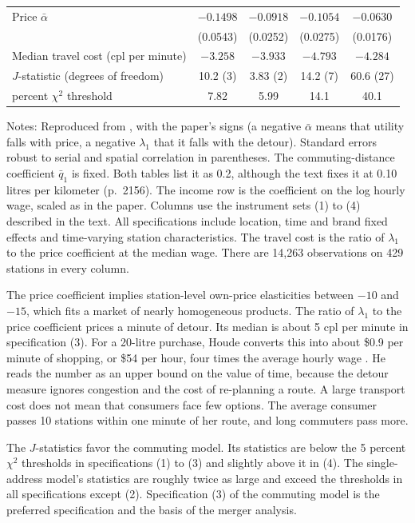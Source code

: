\begin{table}[htbp]
\begin{threeparttable}
\begin{tabular}{@{}lcccc@{}}
Price $\bar\alpha$ & $-0.1498$ & $-0.0918$ & $-0.1054$ & $-0.0630$ \\
 & (0.0543) & (0.0252) & (0.0275) & (0.0176) \\
Median travel cost (cpl per minute) & $-3.258$ & $-3.933$ & $-4.793$ & $-4.284$ \\
$J$-statistic (degrees of freedom) & 10.2 (3) & 3.83 (2) & 14.2 (7) & 60.6 (27) \\
\addlinespace
5 percent $\chi^2$ threshold & 7.82 & 5.99 & 14.1 & 40.1 \\
\bottomrule
\end{tabular}
\begin{tablenotes}[flushleft]
\footnotesize
\item Notes: Reproduced from \citet[Tables 3 and 4]{Houde2012}, with the paper's signs (a negative $\bar\alpha$ means
that utility falls with price, a negative $\lambda_1$ that it falls with the detour). Standard errors robust to serial
and spatial correlation in parentheses. The commuting-distance coefficient $\bar q_1$ is fixed. Both tables list it as
0.2, although the text fixes it at 0.10 litres per kilometer (p.~2156). The income row is the coefficient on the log hourly wage, scaled as in the paper. Columns use the instrument sets (1) to (4)
described in the text. All specifications include location, time and brand fixed effects and time-varying station
characteristics. The travel cost is the ratio of $\lambda_1$ to the price coefficient at the median wage. There are
14,263 observations on 429 stations in every column.
\end{tablenotes}
\end{threeparttable}
\end{table}

The price coefficient implies station-level own-price elasticities between $-10$ and $-15$, which fits a market of
nearly homogeneous products. The ratio of $\lambda_1$ to the price coefficient prices a minute of detour. Its median
is about 5 cpl per minute in specification (3). For a 20-litre purchase, Houde converts this into about \$0.9 per
minute of shopping, or \$54 per hour, four times the average hourly wage \citep[p.~2163]{Houde2012}. He reads the
number as an upper bound on the value of time, because the detour measure ignores congestion and the cost of
re-planning a route. A large transport cost does not mean that consumers face few options. The average consumer
passes 10 stations within one minute of her route, and long commuters pass more.

The $J$-statistics favor the commuting model. Its statistics are below the 5 percent $\chi^2$ thresholds in
specifications (1) to (3) and slightly above it in (4). The single-address model's statistics are roughly twice as
large and exceed the thresholds in all specifications except (2). Specification (3) of the commuting model is
the preferred specification and the basis of the merger analysis.

